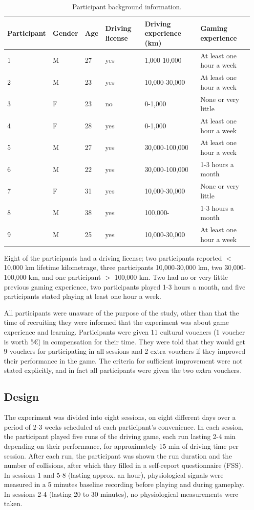 \documentclass[fleqn,10pt]{wlscirep}
\begin{document}
\begin{table}[ht]
\centering
\caption{\label{tab:Participants}Participant background information.}
\begin{tabular}{llllll}
\hline
Participant & Gender & Age & Driving license & Driving experience (km) & Gaming experience \\
\hline
1 & M & 27 & yes & 1,000-10,000 & At least one hour a week \\
2 & M & 23 & yes & 10,000-30,000 & At least one hour a week \\
3 & F & 23 & no & 0-1,000 & None or very little \\
4 & F & 28 & yes & 0-1,000 & At least one hour a week \\
5 & M & 27 & yes & 30,000-100,000 & At least one hour a week \\
6 & M & 22 & yes & 30,000-100,000 & 1-3 hours a month \\
7 & F & 31 & yes & 10,000-30,000 & None or very little \\
8 & M & 38 & yes & 100,000- & 1-3 hours a month \\
9 & M & 25 & yes & 10,000-30,000 & At least one hour a week \\
\hline
\end{tabular}
\end{table}

Eight of the participants had a driving license; two participants reported $<$ 10,000 km lifetime kilometrage, three
participants 10,000-30,000 km, two 30,000-100,000 km, and one participant $>$ 100,000
km. Two had no or very little previous gaming experience, two participants played 1-3 hours a month, and five participants stated playing at least one hour a week.

All participants were unaware of the purpose of the study, other than that the time of recruiting they were informed that the experiment was about game experience and learning. Participants were given 11 cultural vouchers (1 voucher is worth 5€) in compensation for their time. They were told that they would get 9 vouchers for participating in all sessions and 2 extra vouchers if they improved their performance in the game. The criteria for sufficient improvement were not stated explicitly, and in fact all participants were given the two extra vouchers.

\subsection*{Design}
The experiment was divided into eight sessions, on eight different days over a period of 2-3 weeks scheduled at each participant's convenience. In each session, the participant played five runs of the driving game, each run lasting 2-4 min depending on their performance, for approximately 15 min of driving time per session. After each run, the participant was shown the run duration and the number of collisions, after which they filled in a self-report questionnaire (FSS). In sessions 1 and 5-8 (lasting approx. an hour), physiological signals were measured in a 5 minutes baseline recording before playing and during gameplay. In sessions 2-4 (lasting 20 to 30 minutes), no physiological measurements were taken.
\end{document}
